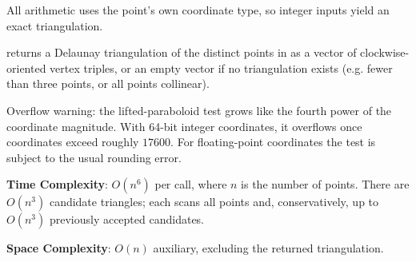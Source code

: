 All arithmetic uses the point's own coordinate type, so integer inputs yield an exact triangulation.

\begin{compactitem}
  \item {} returns a Delaunay triangulation of the distinct points in  as a vector of clockwise-oriented vertex triples, or an empty vector if no triangulation exists (e.g. fewer than three points, or all points collinear).
\end{compactitem}

Overflow warning: the lifted-paraboloid test grows like the fourth power of the coordinate magnitude. With 64-bit integer coordinates, it overflows once coordinates exceed roughly $17600$. For floating-point coordinates the test is subject to the usual rounding error.

\textbf{Time Complexity}: $O(n^{6})$ per call, where $n$ is the number of points. There are $O(n^{3})$ candidate triangles; each scans all points and, conservatively, up to $O(n^{3})$ previously accepted candidates.

\textbf{Space Complexity}: $O(n)$ auxiliary, excluding the returned triangulation.

